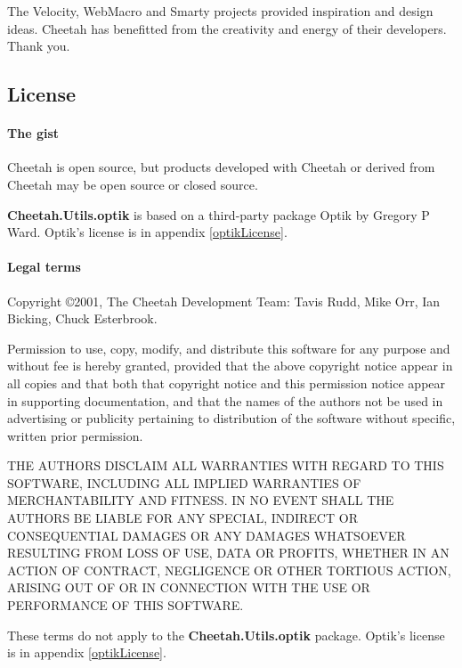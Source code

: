 The Velocity, WebMacro and Smarty projects provided inspiration and design
ideas.  Cheetah has benefitted from the creativity and energy of their
developers. Thank you.

\subsection{License}
\label{intro.license}

\paragraph*{The gist}
Cheetah is open source, but products developed with Cheetah or derived
from Cheetah may be open source or closed source.

{\bf Cheetah.Utils.optik} is based on a third-party package Optik by Gregory
P Ward.  Optik's license is in appendix \ref{optikLicense}.


\paragraph*{Legal terms}
Copyright \copyright 2001, The Cheetah Development Team: Tavis Rudd, Mike Orr,
Ian Bicking, Chuck Esterbrook.

Permission to use, copy, modify, and distribute this software for any purpose
and without fee is hereby granted, provided that the above copyright notice
appear in all copies and that both that copyright notice and this permission
notice appear in supporting documentation, and that the names of the authors not
be used in advertising or publicity pertaining to distribution of the software
without specific, written prior permission.

THE AUTHORS DISCLAIM ALL WARRANTIES WITH REGARD TO THIS SOFTWARE, INCLUDING ALL
IMPLIED WARRANTIES OF MERCHANTABILITY AND FITNESS. IN NO EVENT SHALL THE AUTHORS
BE LIABLE FOR ANY SPECIAL, INDIRECT OR CONSEQUENTIAL DAMAGES OR ANY DAMAGES
WHATSOEVER RESULTING FROM LOSS OF USE, DATA OR PROFITS, WHETHER IN AN ACTION OF
CONTRACT, NEGLIGENCE OR OTHER TORTIOUS ACTION, ARISING OUT OF OR IN CONNECTION
WITH THE USE OR PERFORMANCE OF THIS SOFTWARE.

These terms do not apply to the {\bf Cheetah.Utils.optik} package.  Optik's
license is in appendix \ref{optikLicense}.

